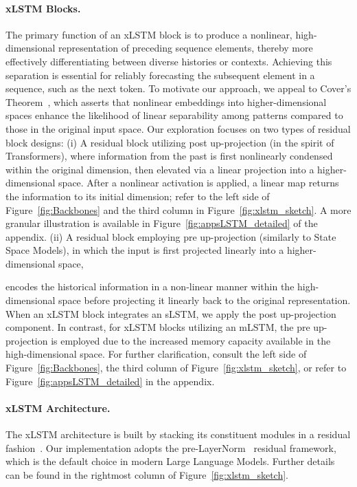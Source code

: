 \paragraph{xLSTM Blocks.}
\label{sec:xLSTMblock}
The primary function of an xLSTM block is to produce a nonlinear, high-dimensional representation of preceding sequence elements, thereby more effectively differentiating between diverse histories or contexts. Achieving this separation is essential for reliably forecasting the subsequent element in a sequence, such as the next token. To motivate our approach, we appeal to Cover’s Theorem~\citep{Cover:65}, which asserts that nonlinear embeddings into higher-dimensional spaces enhance the likelihood of linear separability among patterns compared to those in the original input space. Our exploration focuses on two types of residual block designs: (i) A residual block utilizing post up-projection (in the spirit of Transformers), where information from the past is first nonlinearly condensed within the original dimension, then elevated via a linear projection into a higher-dimensional space. After a nonlinear activation is applied, a linear map returns the information to its initial dimension; refer to the left side of Figure~\ref{fig:Backbones} and the third column in Figure~\ref{fig:xlstm_sketch}. A more granular illustration is available in Figure~\ref{fig:appsLSTM_detailed} of the appendix. (ii) A residual block employing pre up-projection (similarly to State Space Models), in which the input is first projected linearly into a higher-dimensional space,

encodes the historical information in a non-linear manner within the high-dimensional space before projecting it linearly back to the original representation. When an xLSTM block integrates an sLSTM, we apply the post up-projection component. In contrast, for xLSTM blocks utilizing an mLSTM, the pre up-projection is employed due to the increased memory capacity available in the high-dimensional space. For further clarification, consult the left side of Figure~\ref{fig:Backbones}, the third column of Figure~\ref{fig:xlstm_sketch}, or refer to Figure~\ref{fig:appsLSTM_detailed} in the appendix.

\paragraph{xLSTM Architecture. }
\label{sec:xLSTMarchitecure}
The xLSTM architecture is built by stacking its constituent modules in a residual fashion~\citep{Srivastava:15,He:16}. Our implementation adopts the pre-LayerNorm~\citep{Ba:16b} residual framework, which is the default choice in modern Large Language Models. Further details can be found in the rightmost column of Figure~\ref{fig:xlstm_sketch}.

